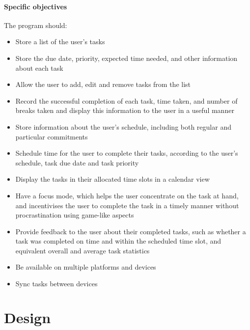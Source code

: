 \documentclass{article}
\begin{document}
\subsection{Specific objectives}
The program should:

\begin{itemize}
	\item Store a list of the user's tasks
	\item Store the due date, priority, expected time needed, and other information
	      about each task
	\item Allow the user to add, edit and remove tasks from the list
	\item Record the successful completion of each task, time taken, and number of
	      breaks taken and display this information to the user in a useful manner
	\item Store information about the user's schedule,
	      including both regular and particular commitments
	\item Schedule time for the user to complete their tasks, according to the
	      user's schedule, task due date and task priority
	\item Display the tasks in their allocated time slots in a calendar view
	\item Have a focus mode, which helps the user concentrate on the task at hand,
	      and incentivises the user to complete the task in a timely manner without
	      procrastination using game-like aspects
	\item Provide feedback to the user about their completed tasks,
	      such as whether a task was completed on time and within the scheduled time slot,
	      and equivalent overall and average task statistics
	\item Be available on multiple platforms and devices
	\item Sync tasks between devices
\end{itemize}


\part{Design}
\end{document}
